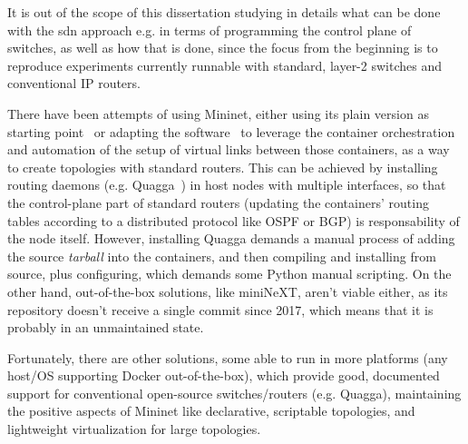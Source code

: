 It is out of the scope of this dissertation studying in details what can be done with the \gls{sdn} approach e.g. in terms of programming the control plane of switches, as well as how that is done, since the focus from the beginning is to reproduce experiments currently runnable with standard, layer-2 switches and conventional IP routers.

There have been attempts of using Mininet, either using its plain version as starting point~\cite{mininetquagga,mininetospfbgp} or adapting the software~\cite{mininext} to leverage the container orchestration and automation of the setup of virtual links between those containers, as a way to create topologies with standard routers.
This can be achieved by installing routing daemons (e.g. Quagga~\cite{quagga}) in host nodes with multiple interfaces, so that the control-plane part of standard routers (updating the containers' routing tables according to a distributed protocol like OSPF or BGP) is responsability of the node itself.
However, installing Quagga demands a manual process of adding the source \emph{tarball} into the containers, and then compiling and installing from source, plus configuring, which demands some Python manual scripting.
On the other hand, out-of-the-box solutions, like miniNeXT, aren't viable either, as its repository doesn't receive a single commit since 2017, which means that it is probably in an unmaintained state.

Fortunately, there are other solutions, some able to run in more platforms (any host/OS supporting Docker out-of-the-box), which provide good, documented support for conventional open-source switches/routers (e.g. Quagga), maintaining the positive aspects of Mininet like declarative, scriptable topologies, and lightweight virtualization for large topologies.

